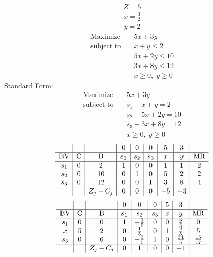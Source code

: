 \documentclass{article}
\begin{document}
\begin{align*}
Z=5\end{align*}
\begin{align*}
x=\frac{3}{2}\end{align*}
\begin{align*}
y=2\end{align*}
\begin{align*}
\text{Maximize} \quad & 5x + 3y\\
\text{subject to} \quad
& x + y\le2\\
& 5x + 2y\le10\\
& 3x + 8y\le12\\
& x\ge0,\; y\ge0\end{align*}
Standard Form:\\
\begin{align*}
\text{Maximize} \quad & 5x + 3y\\
\text{subject to} \quad
& s_{1} + x + y=2\\
& s_{2} + 5x + 2y=10\\
& s_{3} + 3x + 8y=12\\
& x\ge0,\; y\ge0\end{align*}
\begin{align*}
\begin{array}{c|c|c|c|c|c|c|c|c}
 &  &  & 0 & 0 & 0 & 5 & 3 & \\
\hline
\text{BV} & \text{C} & \text{B} & s_{1} & s_{2} & s_{3} & x & y & \text{MR} \\
\hline
s_{1} & 0 & 2 & 1 & 0 & 0 & 1 & 1 & 2 \\
s_{2} & 0 & 10 & 0 & 1 & 0 & 5 & 2 & 2 \\
s_{3} & 0 & 12 & 0 & 0 & 1 & 3 & 8 & 4 \\
\hline
 &  & Z_j-C_j & 0 & 0 & 0 & -5 & -3 & \\
\end{array}
\end{align*}
\begin{align*}
\begin{array}{c|c|c|c|c|c|c|c|c}
 &  &  & 0 & 0 & 0 & 5 & 3 & \\
\hline
\text{BV} & \text{C} & \text{B} & s_{1} & s_{2} & s_{3} & x & y & \text{MR} \\
\hline
s_{1} & 0 & 0 & 1 & -\frac{1}{5} & 0 & 0 & \frac{3}{5} & 0 \\
x & 5 & 2 & 0 & \frac{1}{5} & 0 & 1 & \frac{2}{5} & 5 \\
s_{3} & 0 & 6 & 0 & -\frac{3}{5} & 1 & 0 & \frac{34}{5} & \frac{15}{17} \\
\hline
 &  & Z_j-C_j & 0 & 1 & 0 & 0 & -1 & \\
\end{array}
\end{align*}
\end{document}
